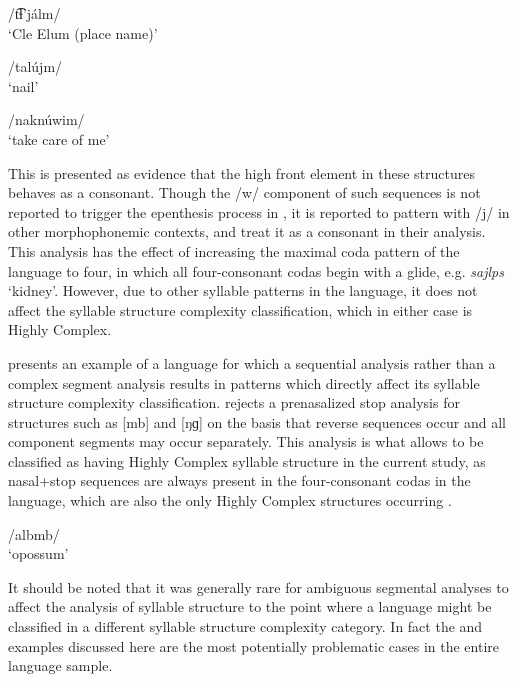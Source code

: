 \ea\label{ex:4.7}

\ea /t͡ɬ’jálm/\\\relax
  [t͡ɬ’jálɨm]
\glt  ‘Cle Elum (place name)’

\ex  /talújm/\\\relax
  [talújɨm]
\glt   ‘nail’

\ex  /naknúwim/\\\relax
  [naknúwim]
\glt  ‘take care of me’ \citep[28]{HargusBeavert2006}
\z
\z

This is presented as evidence that the high front element in these structures behaves as a consonant. Though the /w/ component of such sequences is not reported to trigger the epenthesis process in , it is reported to pattern with /j/ in other morphophonemic contexts, and \citet{HargusBeavert2006} treat it as a consonant in their analysis. This analysis has the effect of increasing the maximal coda pattern of the language to four, in which all four-consonant codas begin with a glide, e.g. \textit{sajlps} ‘kidney’. However, due to other syllable patterns in the language, it does not affect the syllable structure complexity classification, which in either case is Highly Complex.

   presents an example of a language for which a sequential analysis rather than a complex segment analysis results in patterns which directly affect its syllable structure complexity classification. \citet[34]{Sommer1969}  rejects a prenasalized stop analysis for structures such as [mb] and [ŋɡ] on the basis that reverse sequences occur and all component segments may occur separately. This analysis is what allows  to be classified as having Highly Complex syllable structure in the current study, as nasal+stop sequences are always present in the four-consonant codas in the language, which are also the only Highly Complex structures occurring .

\ea\label{ex:4.8}

/albmb/\\
\glt ‘opossum’
\citep[33]{Sommer1969}
\z

  It should be noted that it was generally rare for ambiguous segmental analyses to affect the analysis of syllable structure to the point where a language might be classified in a different syllable structure complexity category. In fact the  and  examples discussed here are the most potentially problematic cases in the entire language sample.

